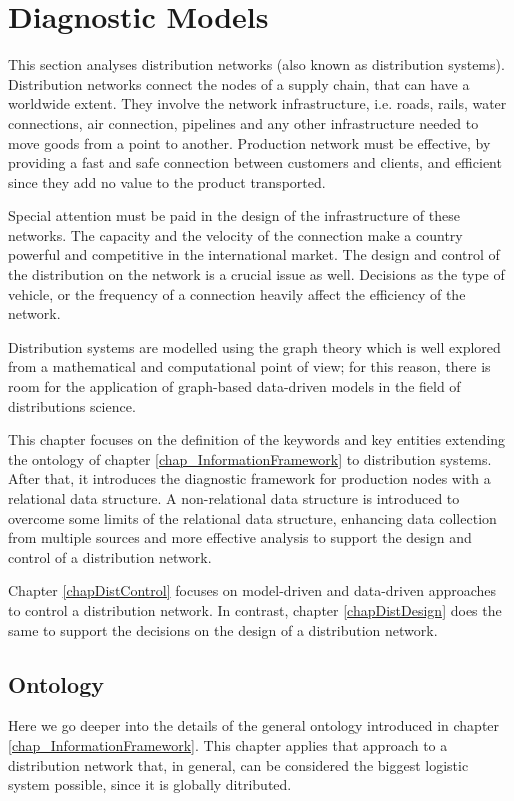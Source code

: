 \chapter{Diagnostic Models}
This section analyses distribution networks (also known as distribution systems). Distribution networks connect the nodes of a supply chain, that can have a worldwide extent. They involve the network infrastructure, i.e. roads, rails, water connections, air connection, pipelines and any other infrastructure needed to move goods from a point to another. Production network must be effective, by providing a fast and safe connection between customers and clients, and efficient since they add no value to the product transported.\par

Special attention must be paid in the design of the infrastructure of these networks. The capacity and the velocity of the connection make a country powerful and competitive in the international market.  The design and control of the distribution on the network is a crucial issue as well. Decisions as the type of vehicle, or the frequency of a connection heavily affect the efficiency of the network.\par

Distribution systems are modelled using the graph theory which is well explored from a mathematical and computational point of view; for this reason, there is room for the application of graph-based data-driven models in the field of distributions science.\par

This chapter focuses on the definition of the keywords and key entities extending the ontology of chapter \ref{chap_InformationFramework} to distribution systems. After that, it introduces the diagnostic framework for production nodes with a relational data structure. A non-relational data structure is introduced to overcome some limits of the relational data structure, enhancing data collection from multiple sources and more effective analysis to support the design and control of a distribution network.\par

Chapter \ref{chapDistControl} focuses on model-driven and data-driven approaches to control a distribution network. In contrast, chapter \ref{chapDistDesign} does the same to support the decisions on the design of a distribution network.

\section{Ontology} \label{secOntologyDistribution}
Here we go deeper into the details of the general ontology introduced in chapter \ref{chap_InformationFramework}. This chapter applies that approach to a distribution network that, in general, can be considered the biggest logistic system possible, since it is globally ditributed. 

